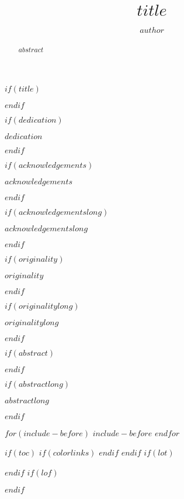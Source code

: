 \documentclass[a4paper, 12pt, twoside]{$thesis_class$}
\title{$title$}            %
\author{$author$}          %
\theoremstyle{plain}
\theoremstyle{definition}
\theoremstyle{remark}
\begin{document}
$if(title)$
\maketitle
$endif$

$if(dedication)$
\begin{dedication}
$dedication$
\end{dedication}
$endif$

$if(acknowledgements)$
\begin{acknowledgements}
$acknowledgements$
\end{acknowledgements}
$endif$

$if(acknowledgementslong)$
\begin{acknowledgementslong}
$acknowledgementslong$
\end{acknowledgementslong}
$endif$

$if(originality)$
\begin{originality}
$originality$
\end{originality}
$endif$

$if(originalitylong)$
\begin{originalitylong}
$originalitylong$
\end{originalitylong}
$endif$

$if(abstract)$
\begin{abstract}
$abstract$
\end{abstract}
$endif$

$if(abstractlong)$
\begin{abstractlong}
$abstractlong$
\end{abstractlong}
$endif$

$for(include-before)$
$include-before$
$endfor$

$if(toc)$ 
$if(colorlinks)$ \hypersetup{linkcolor=black} $endif$
\setcounter{page}{1}
\setcounter{tocdepth}{$toc-depth$}
\tableofcontents 
$endif$
$if(lot)$
\listoftables
$endif$
$if(lof)$
\listoffigures
$endif$
\newpage
\end{document}
